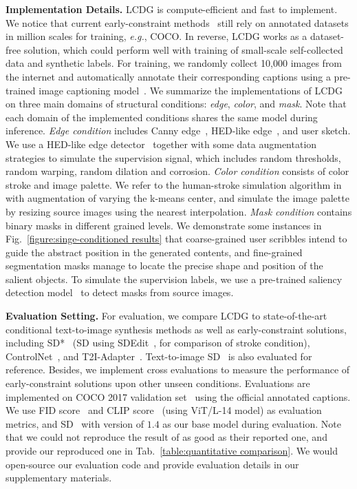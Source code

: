 \documentclass{article}
\begin{document}
\textbf{Implementation Details.} LCDG is compute-efficient and fast to implement. We notice that current early-constraint methods~\cite{mou2023t2i, zhang2023adding} still rely on annotated datasets in million scales for training, \textit{e.g.}, COCO. In reverse, LCDG works as a dataset-free solution, which could perform well with training of small-scale self-collected data and synthetic labels. For training, we randomly collect 10,000 images from the internet and automatically annotate their corresponding captions using a pre-trained image captioning model~\cite{hu2022expansionnet}. We summarize the implementations of LCDG on three main domains of structural conditions: \textit{edge}, \textit{color}, and \textit{mask}. Note that each domain of the implemented conditions shares the same model during inference. \textit{Edge condition} includes Canny edge~\cite{canny1986computational}, HED-like edge~\cite{xie2015holistically}, and user sketch. We use a HED-like edge detector~\cite{he2020bdcn} together with some data augmentation strategies to simulate the supervision signal, which includes random thresholds, random warping, random dilation and corrosion. \textit{Color condition} consists of color stroke and image palette. We refer to the human-stroke simulation algorithm in~\cite{meng2021sdedit} with augmentation of varying the k-means center, and simulate the image palette by resizing source images using the nearest interpolation. \textit{Mask condition} contains binary masks in different grained levels. We demonstrate some instances in Fig.~\ref{figure:singe-conditioned results} that coarse-grained user scribbles intend to guide the abstract position in the generated contents, and fine-grained segmentation masks manage to locate the precise shape and position of the salient objects. To simulate the supervision labels, we use a pre-trained saliency detection model~\cite{qin2020u2} to detect masks from source images.

\textbf{Evaluation Setting.} For evaluation, we compare LCDG to state-of-the-art conditional text-to-image synthesis methods as well as early-constraint solutions, including SD*~\cite{rombach2022high} (SD using SDEdit~\cite{meng2021sdedit}, for comparison of stroke condition), ControlNet~\cite{zhang2023adding}, and T2I-Adapter~\cite{mou2023t2i}. Text-to-image SD~\cite{rombach2022high} is also evaluated for reference. Besides, we implement cross evaluations to measure the performance of early-constraint solutions upon other unseen conditions. Evaluations are implemented on COCO 2017 validation set~\cite{lin2014microsoft} using the official annotated captions. We use FID score~\cite{NIPS2017_8a1d6947} and CLIP score~\cite{radford2021learning} (using ViT/L-14 model) as evaluation metrics, and SD~\cite{rombach2022high} with version of $1.4$ as our base model during evaluation. Note that we could not reproduce the result of \cite{mou2023t2i} as good as their reported one, and provide our reproduced one in Tab.~\ref{table:quantitative comparison}. We would open-source our evaluation code and provide evaluation details in our supplementary materials.
\end{document}
